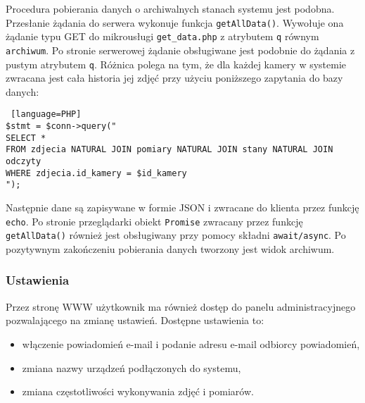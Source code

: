 \documentclass[a4paper,11pt,twoside]{article}
\begin{document}
Procedura pobierania danych o archiwalnych stanach systemu jest podobna. Przesłanie żądania do serwera wykonuje funkcja \texttt{getAllData()}. Wywołuje ona żądanie typu GET do mikrousługi \texttt{get{\_}data.php} z atrybutem \texttt{q} równym \texttt{archiwum}. Po stronie serwerowej żądanie obsługiwane jest podobnie do żądania z pustym atrybutem \texttt{q}. Różnica polega na tym, że dla każdej kamery w systemie zwracana jest cała historia jej zdjęć przy użyciu poniższego zapytania do bazy danych:
\begin{lstlisting} [language=PHP]
$stmt = $conn->query("
SELECT *
FROM zdjecia NATURAL JOIN pomiary NATURAL JOIN stany NATURAL JOIN odczyty
WHERE zdjecia.id_kamery = $id_kamery
");
\end{lstlisting}
Następnie dane są zapisywane w formie JSON i zwracane do klienta przez funkcję \texttt{echo}. Po stronie przeglądarki obiekt \texttt{Promise} zwracany przez funkcję \texttt{getAllData()} również jest obsługiwany przy pomocy składni \texttt{await/async}. Po pozytywnym zakończeniu pobierania danych tworzony jest widok archiwum.

\subsubsection{Ustawienia}
Przez stronę WWW użytkownik ma również dostęp do panelu administracyjnego pozwalającego na zmianę ustawień. Dostępne ustawienia to:
\begin{itemize}
\item włączenie powiadomień e-mail i podanie adresu e-mail odbiorcy powiadomień,
\item zmiana nazwy urządzeń podłączonych do systemu,
\item zmiana częstotliwości wykonywania zdjęć i pomiarów.
\end{itemize}
\end{document}
